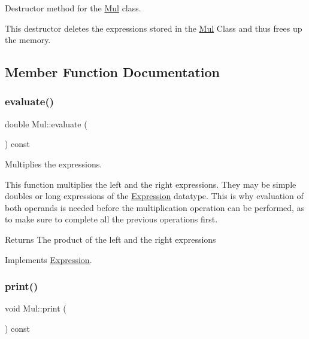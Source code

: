 Destructor method for the \hyperlink{class_mul}{Mul} class. 

This destructor deletes the expressions stored in the \hyperlink{class_mul}{Mul} Class and thus frees up the memory. 

\subsection{Member Function Documentation}
\mbox{\label{class_mul_a3e98f760d06aaac61dda9ab57d174a35}} 
\subsubsection{\texorpdfstring{evaluate()}{evaluate()}}
{\footnotesize\ttfamily double Mul\+::evaluate (\begin{DoxyParamCaption}{ }\end{DoxyParamCaption}) const\hspace{0.3cm}{\ttfamily [virtual]}}



Multiplies the expressions. 

This function multiplies the left and the right expressions. They may be simple doubles or long expressions of the \hyperlink{class_expression}{Expression} datatype. This is why evaluation of both operands is needed before the multiplication operation can be performed, as to make sure to complete all the previous operations first.

\begin{DoxyReturn}{Returns}
The product of the left and the right expressions 
\end{DoxyReturn}


Implements \hyperlink{class_expression_a7437adfabeaeb0500d62d10c43a1f853}{Expression}.

\mbox{\label{class_mul_a0aa9276f2fc04dd9afc77bf47542e5ec}} 
\subsubsection{\texorpdfstring{print()}{print()}}
{\footnotesize\ttfamily void Mul\+::print (\begin{DoxyParamCaption}{ }\end{DoxyParamCaption}) const\hspace{0.3cm}{\ttfamily [virtual]}}



